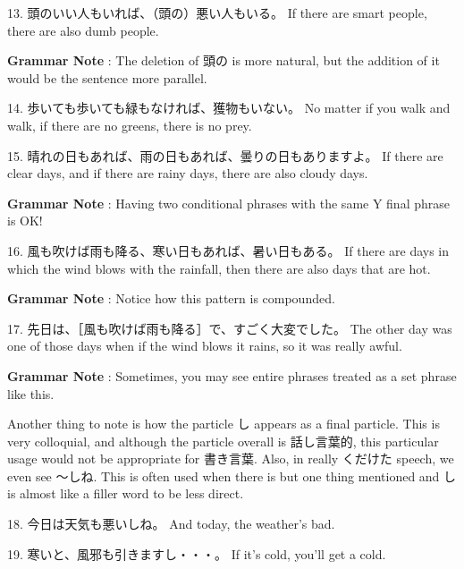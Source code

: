 \par{13. 頭のいい人もいれば、（頭の）悪い人もいる。 \hfill\break
If there are smart people, there are also dumb people. }

\par{\textbf{Grammar Note }: The deletion of 頭の is more natural, but the addition of it would be the sentence more parallel. }

\par{14. 歩いても歩いても緑もなければ、獲物もいない。 \hfill\break
No matter if you walk and walk, if there are no greens, there is no prey. }

\par{15. 晴れの日もあれば、雨の日もあれば、曇りの日もありますよ。 \hfill\break
If there are clear days, and if there are rainy days, there are also cloudy days. }

\par{\textbf{Grammar Note }: Having two conditional phrases with the same Y final phrase is OK! }

\par{16. 風も吹けば雨も降る、寒い日もあれば、暑い日もある。 \hfill\break
If there are days in which the wind blows with the rainfall, then there are also days that are hot. }

\par{\textbf{Grammar Note }: Notice how this pattern is compounded. }

\par{17. 先日は、［風も吹けば雨も降る］で、すごく大変でした。 \hfill\break
The other day was one of those days when if the wind blows it rains, so it was really awful. }

\par{\textbf{Grammar Note }: Sometimes, you may see entire phrases treated as a set phrase like this. }

\par{ Another thing to note is how the particle し appears as a final particle. This is very colloquial, and although the particle overall is 話し言葉的, this particular usage would not be appropriate for 書き言葉. Also, in really くだけた speech, we even see ～しね. This is often used when there is but one thing mentioned and し is almost like a filler word to be less direct. }

\par{18. 今日は天気も悪いしね。 \hfill\break
And today, the weather's bad. }

\par{19. 寒いと、風邪も引きますし・・・。 \hfill\break
If it's cold, you'll get a cold. }

